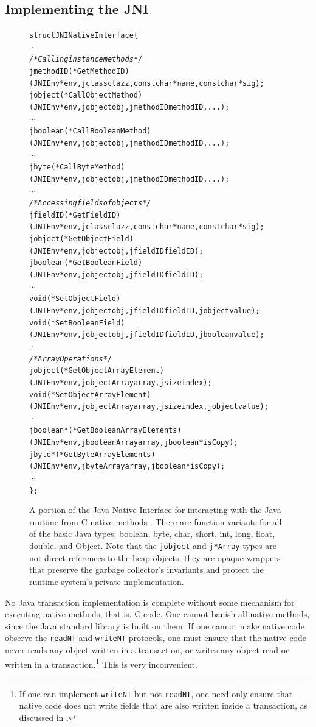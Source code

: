 \subsection{Implementing the JNI}
\begin{figure}\sis\fontsize{9}{10}\begin{alltt}
struct JNINativeInterface \{
  \(\cdots\)
  \textit{/* Calling instance methods */}
  jmethodID (*GetMethodID)
    (JNIEnv *env, jclass clazz, const char *name, const char *sig);
  jobject (*CallObjectMethod)
    (JNIEnv *env, jobject obj, jmethodID methodID, ...);
  \(\cdots\)
  jboolean (*CallBooleanMethod)
    (JNIEnv *env, jobject obj, jmethodID methodID, ...);
  \(\cdots\)
  jbyte (*CallByteMethod)
    (JNIEnv *env, jobject obj, jmethodID methodID, ...);
  \(\cdots\)
  \textit{/* Accessing fields of objects */}
  jfieldID (*GetFieldID)
    (JNIEnv *env, jclass clazz, const char *name, const char *sig);
  jobject (*GetObjectField)
    (JNIEnv *env, jobject obj, jfieldID fieldID);
  jboolean (*GetBooleanField)
    (JNIEnv *env, jobject obj, jfieldID fieldID);
  \(\cdots\)
  void (*SetObjectField)
    (JNIEnv *env, jobject obj, jfieldID fieldID, jobject value);
  void (*SetBooleanField)
    (JNIEnv *env, jobject obj, jfieldID fieldID, jboolean value);
  \(\cdots\)
  \textit{/* Array Operations */}
  jobject (*GetObjectArrayElement)
    (JNIEnv *env, jobjectArray array, jsize index);
  void (*SetObjectArrayElement)
    (JNIEnv *env, jobjectArray array, jsize index, jobject value);
  \(\cdots\)
  jboolean* (*GetBooleanArrayElements)
    (JNIEnv *env, jbooleanArray array, jboolean *isCopy);
  jbyte* (*GetByteArrayElements)
    (JNIEnv *env, jbyteArray array, jboolean *isCopy);
  \(\cdots\)
\};
\end{alltt}
\caption[A portion of the Java Native Interface] {A portion of the
  Java Native Interface for interacting with the Java runtime from C
  native methods \cite{JNI}.  There are function variants for all of the
  basic Java types: boolean, byte, char, short, int, long, float,
  double, and Object.  Note that the \texttt{jobject} and
  \texttt{j*Array} types are not direct references to the heap
  objects; they are opaque wrappers that preserve the garbage
  collector's invariants and protect the runtime system's private
  implementation.}
\label{fig:jni}
\end{figure}

No Java transaction implementation is complete without some mechanism
for executing native methods, that is, C code.  One cannot banish all
native methods, since the Java standard library is built on them. 
If one cannot make native code observe the \texttt{readNT} and
\texttt{writeNT} protocols, one must ensure that the native code never
reads any object written in a transaction, or writes any object read
or written in a transaction.\footnote{If one
  can implement \texttt{writeNT} but not \texttt{readNT}, one need
  only ensure that native code does not write fields that are also
  written inside a transaction, as discussed in .}  This
is very inconvenient.

